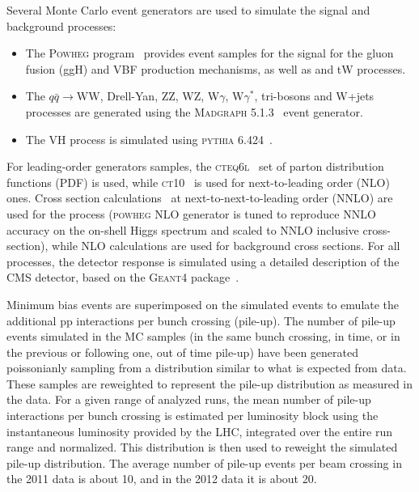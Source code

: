 Several Monte Carlo event generators are used to simulate the signal and background processes:
\begin{itemize}
\item The \textsc{Powheg} program~\cite{powheg} provides event samples for the \hww signal
for the gluon fusion (ggH) and VBF production mechanisms, as well as \ttbar and tW processes.
\item The $q\bar{q} \to \mathrm{WW}$, Drell-Yan, ZZ, WZ, W$\gamma$, W$\gamma^*$, tri-bosons and W+jets processes are generated using
the \textsc{Madgraph 5.1.3}~\cite{madgraph} event generator.
\item The VH process is simulated using \textsc{pythia 6.424}~\cite{pythia}.
\end{itemize}
For leading-order generators samples, the \textsc{cteq6l}~\cite{cteq66} set of parton distribution functions
(PDF) is used, while \textsc{ct10}~\cite{ct10} is used for next-to-leading order (NLO) ones.
Cross section calculations~\cite{LHCHiggsCrossSectionWorkingGroup:2011ti} at next-to-next-to-leading order (NNLO) are used for the \hww process (\textsc{powheg} NLO generator is tuned to reproduce NNLO accuracy on the on-shell Higgs \pt spectrum and scaled to NNLO inclusive cross-section), while NLO calculations are used for background cross sections.
For all processes, the detector response is simulated using a detailed description of the CMS detector, based on the \textsc{Geant4} package~\cite{Agostinelli:2002hh}.

Minimum bias events are superimposed on the simulated events to emulate the additional 
pp interactions per bunch crossing (pile-up). The number of pile-up events simulated in the MC samples
(in the same bunch crossing, in time, or in the previous or following one, out of time pile-up)
have been generated poissonianly sampling from a distribution similar to what
is expected from data. These samples are reweighted to represent the pile-up
distribution as measured in the data. For a given range of analyzed runs, the mean number of pile-up
interactions per bunch crossing is estimated per luminosity block using the instantaneous luminosity provided by
the LHC, integrated over the entire run range and normalized. This distribution
is then used to reweight the simulated pile-up distribution. 
The average number of pile-up events per beam crossing in the 2011 data is about 10, and in the 2012 data it is about 20.


